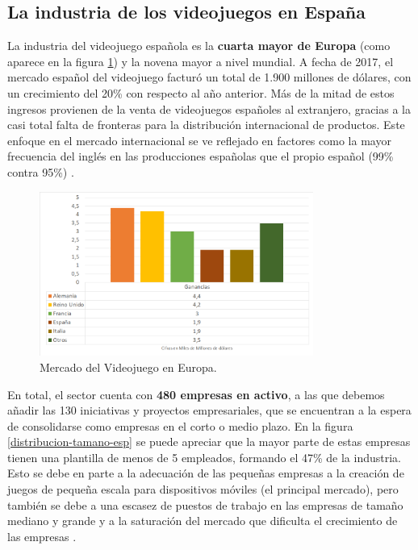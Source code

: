 \subsection{La industria de los videojuegos en España}
La industria del videojuego española es la \textbf{cuarta mayor de Europa} (como aparece en la figura \ref{distribucion-mercado-europa}) y la novena mayor a nivel mundial. A fecha de 2017, el mercado español del videojuego facturó un total de 1.900 millones de dólares, con un crecimiento del 20\% con respecto al año anterior. Más de la mitad de estos ingresos provienen de la venta de videojuegos españoles al extranjero, gracias a la casi total falta de fronteras para la distribución internacional de productos. Este enfoque en el mercado internacional se ve reflejado en factores como la mayor frecuencia del inglés en las producciones españolas que el propio español (99\% contra 95\%) \cite{libro_blanco}.

\begin{figure}[h]
    \centering
    \includegraphics[width=0.8\textwidth]{images/estadodelarte/mercado/distribucion-mercado-europa}
    \caption{Mercado del Videojuego en Europa.}
    \label{distribucion-mercado-europa}
\end{figure}

En total, el sector cuenta con \textbf{480 empresas en activo}, a las que debemos añadir las 130 iniciativas y proyectos empresariales, que se encuentran a la espera de consolidarse como empresas en el corto o medio plazo. En la figura \ref{distribucion-tamano-esp} se puede apreciar que la mayor parte de estas empresas tienen una plantilla de menos de 5 empleados, formando el 47\% de la industria. Esto se debe en parte a la adecuación de las pequeñas empresas a la creación de juegos de pequeña escala para dispositivos móviles (el principal mercado), pero también se debe a una escasez de puestos de trabajo en las empresas de tamaño mediano y grande y a la saturación del mercado que dificulta el crecimiento de las empresas \cite{libro_blanco}.


